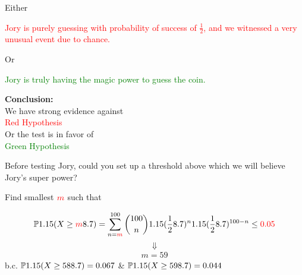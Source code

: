 \begin{frame}[fragile]
 \begin{center}
 \begin{minipage}{0.6\textwidth}
 \begin{center}
 Either
 \bigskip

\textcolor{red}{Jory is purely guessing with probability of success of $\frac{1}{2}$, and we witnessed a very unusual event due to chance.}

  \bigskip \pause
  Or
  \bigskip

  \textcolor{green}{ Jory is truly having the magic power to guess the coin.}
  \bigskip \pause

\mySeparateLine

{\bf Conclusion:}\\[1em]

We have strong evidence against \\
\textcolor{red}{Red Hypothesis} \\[1em]

Or the test is in favor of \\
\textcolor{green}{Green Hypothesis}



\end{center}
 \end{minipage}
\end{center}
\end{frame}
\begin{frame}[fragile]
 \begin{center}
 \begin{minipage}{0.6\textwidth}
 \begin{center}
  Before testing Jory, could you set up a threshold above which we will believe Jory's super power?
  \bigskip
  \pause

  Find smallest $\textcolor{red}{m}$ such that

\begin{align*}
  \mathbb{P}1.15(X\ge \textcolor{red}{m}8.7) = \sum_{n=\textcolor{red}{m}}^{100} \binom{100}{n} 1.15(\frac{1}{2}8.7)^n 1.15(\frac{1}{2}8.7)^{100-n} \le \textcolor{red}{0.05}
\end{align*}
\pause
\[\Downarrow\]
\begin{align*}
\boxed{m = 59}
\end{align*}
\small
b.c. $\mathbb{P}1.15(X\ge 588.7)=0.067$ \& $\mathbb{P}1.15(X\ge 598.7)=0.044$
  \end{center}
 \end{minipage}
\end{center}
\end{frame}
